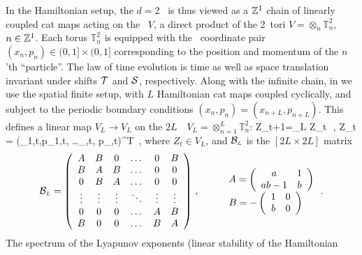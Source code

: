 \documentclass[12pt]{iopart}
\begin{document}
In the Hamiltonian setup, the $d=2$ \catlatt\ is thus viewed as a
$\mathbb{Z}^1$ chain of  linearly coupled cat maps acting on the \statesp\
$V$, a direct product of the  2\dmn\  tori $V=\otimes_{n}\mathbb{T}_n^2$,
${n\in\mathbb{Z}^1}$. Each torus $\mathbb{T}_n^2$ is equipped with the
\statesp\ coordinate pair $(x_{n},p_{n}) \in (0,1]\times(0,1]$
corresponding to the position and momentum  of the $n$'th ``particle''.
The law of time evolution \refeq{eqmotion} is time as well as space
translation invariant under shifts $\mathcal{T}$ and $\mathcal{S}$, respectively.
Along  with the infinite chain, in
 we use the spatial
finite setup,
with $L$
Hamiltonian cat maps coupled cyclically, and  subject to
the periodic boundary conditions $(x_{n},p_{n}) = (x_{n+L},p_{n+L})$.
This  defines a linear map
\(
V_{\scriptscriptstyle L}\to V_{\scriptscriptstyle L}
\)
on the $2L$\dmn\  \statesp\ $V_{\scriptscriptstyle L}=\otimes_{n=1}^L
\mathbb{T}_n^2$:
\beq
Z_{t+1}=\B_{\scriptscriptstyle L} Z_{t}\,\;\; 
\,, \qquad
Z_{t}
= (\ssp_{1,t},p_{1,t}, \dots  \ssp_{{},t},
   p_{{\scriptscriptstyle{L}},t})^T
\,,
where $Z_{t}\in{V_{\scriptscriptstyle L}}$,
and $\B_{\scriptscriptstyle L}$ is the $[2L\!\times\!2L]$  matrix
\[
 \B_{\scriptscriptstyle L}= \left(\begin{array}{cccccc}
      A     & B     &     0  & \dots  & 0 & B\\
      B     & A     &     B      &\dots  &  0 & 0\\
       0 & B     &    A      &\dots  &  0 & 0\\
      \vdots&\vdots &   \vdots & \ddots &\vdots  &\vdots \\
       0 &  0 &    0  & \dots  &A  & B\\
      B     &  0 &    0  & \dots  &B  & A\\
     \end{array} \right)
 \,,\qquad\begin{array}{l}
A= \left(\begin{array}{cc} a& 1\\
ab-1 & b
\end{array} \right)
 \\
B=-\left(\begin{array}{cc} 1& 0\\
b & 0
\end{array} \right)
          \end{array}
\,.
\]
The spectrum of the Lyapunov exponents (linear stability of the Hamiltonian
\end{document}
